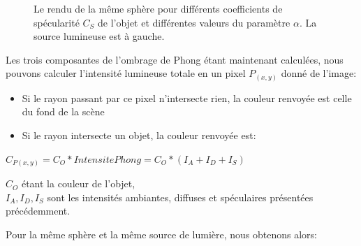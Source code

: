 \documentclass[11pt]{article}
\begin{document}
\begin{figure}[h!]

	\caption{Le rendu de la même sphère pour différents coefficients de spécularité $C_S$ de l'objet et différentes valeurs du paramètre $\alpha$. La source lumineuse est à gauche.}
	\label{differentSpecular}
\end{figure}
\FloatBarrier

Les trois composantes de l'ombrage de Phong étant maintenant calculées, nous pouvons calculer l'intensité lumineuse totale en un pixel $P_{(x, y)}$ donné de l'image:
\begin{itemize}
	\item{Si le rayon passant par ce pixel n'intersecte rien, la couleur renvoyée est celle du fond de la scène}
	\item{Si le rayon intersecte un objet, la couleur renvoyée est:}
\end{itemize}
\begin{center}
$C_{P(x, y)} = C_O * IntensitePhong = C_O*(I_A + I_D + I_S)$
\end{center}
$C_O$ étant la couleur de l'objet,\\
$I_A, I_D, I_S$ sont les intensités ambiantes, diffuses et spéculaires présentées précédemment.

Pour la même sphère et la même source de lumière, nous obtenons alors:
\end{document}
